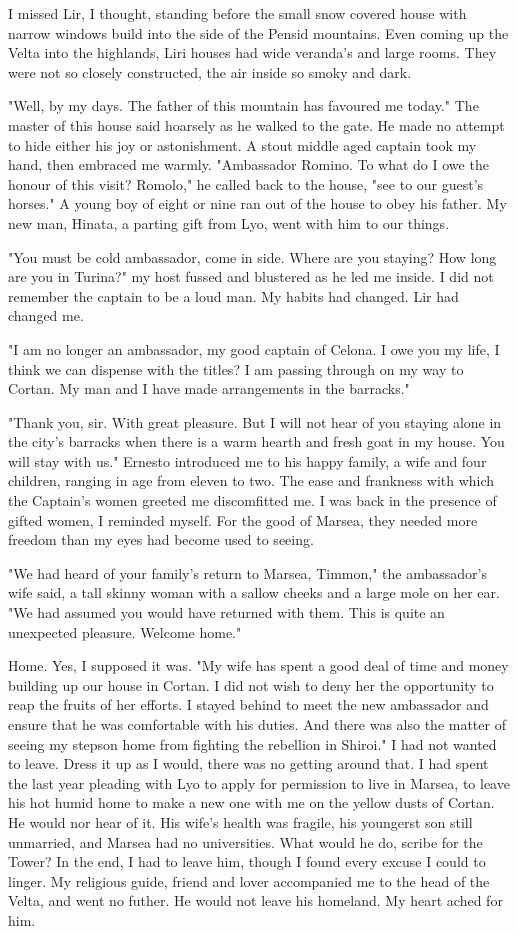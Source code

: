 \documentclass{article}
\begin{document}
I missed Lir, I thought, standing before the small snow covered house with narrow windows build into the side of the Pensid mountains. Even coming up the Velta into the highlands, Liri houses had wide veranda's and large rooms. They were not so closely constructed, the air inside so smoky and dark. 

"Well, by my days. The father of this mountain has favoured me today." The master of this house said hoarsely as he walked to the gate. He made no attempt to hide either his joy or astonishment. A stout middle aged captain took my hand, then embraced me warmly. "Ambassador Romino. To what do I owe the honour of this visit? Romolo," he called back to the house, "see to our guest's horses." A young boy of eight or nine ran out of the house to obey his father. My new man, Hinata, a parting gift from Lyo, went with him to our things.

"You must be cold ambassador, come in side. Where are you staying? How long are you in Turina?" my host fussed and blustered as he led me inside. I did not remember the captain to be a loud man. My habits had changed. Lir had changed me.

"I am no longer an ambassador, my good captain of Celona. I owe you my life, I think we can dispense with the titles? I am passing through on my way to Cortan. My man and I have made arrangements in the barracks." 

"Thank you, sir. With great pleasure. But I will not hear of you staying alone in the city's barracks when there is a warm hearth and fresh goat in my house. You will stay with us." Ernesto introduced me to his happy family, a wife and four children, ranging in age from eleven to two. The ease and frankness with which the Captain's women greeted me discomfitted me. I was back in the presence of gifted women, I reminded myself. For the good of Marsea, they needed more freedom than my eyes had become used to seeing. 

"We had heard of your family's return to Marsea, Timmon," the ambassador's wife said, a tall skinny woman with a sallow cheeks and a large mole on her ear. "We had assumed you would have returned with them. This is quite an unexpected pleasure. Welcome home."

Home. Yes, I supposed it was. "My wife has spent a good deal of time and money building up our house in Cortan. I did not wish to deny her the opportunity to reap the fruits of her efforts. I stayed behind to meet the new ambassador and ensure that he was comfortable with his duties. And there was also the matter of seeing my stepson home from fighting the rebellion in Shiroi." I had not wanted to leave. Dress it up as I would, there was no getting around that. I had spent the last year pleading with Lyo to apply for permission to live in Marsea, to leave his hot humid home to make a new one with me on the yellow dusts of Cortan. He would nor hear of it. His wife's health was fragile, his youngerst son still unmarried, and Marsea had no universities. What would he do, scribe for the Tower? In the end, I had to leave him, though I found every excuse I could to linger. My religious guide, friend and lover accompanied me to the head of the Velta, and went no futher. He would not leave his homeland. My heart ached for him.
\end{document}
